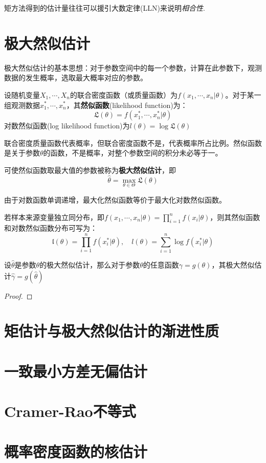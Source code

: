 \begin{remark}
    矩方法得到的估计量往往可以援引大数定律(LLN)来说明\emph{相合性}. 
\end{remark}

\section{极大然似估计}

极大然似估计的基本思想：对于参数空间中的每一个参数，计算在此参数下，观测数据的发生概率，选取最大概率对应的参数。

\begin{definition}[然似函数]
    设随机变量$X_1,\cdots ,X_n$的联合密度函数（或质量函数）为$f(x_1,\cdots ,x_n|\theta)$。对于某一组观测数据$x_1^* ,\cdots ,x_n^*$，其\textbf{然似函数}(likelihood function)为：
    \[ \mathfrak{L}(\theta) = f(x_1^* ,\cdots ,x_n^*|\theta) \]
    对数然似函数(log likelihood function)为$l(\theta)=\log\mathfrak{L}(\theta)$
\end{definition}
\begin{remark}
    联合密度质量函数代表概率，但联合密度函数不是，代表概率所占比例。然似函数是关于参数$\theta$的函数，不是概率，对整个参数空间的积分未必等于一。
\end{remark}

\begin{definition}[极大然似估计]
    可使然似函数取最大值的参数被称为\textbf{极大然似估计}，即
    \[ \hat{\theta}=\max_{\theta \in \Theta}\mathfrak{L}(\theta) \]
\end{definition}
\begin{remark}
    由于对数函数单调递增，最大化然似函数等价于最大化对数然似函数。
\end{remark}

若样本来源变量独立同分布，即$f(x_1,\cdots ,x_n|\theta)=\prod_{i=1}^nf(x_i|\theta)$，则其然似函数和对数然似函数分布可写为：
\[ \mathfrak{l}(\theta) = \prod_{i=1}^nf(x_i^*|\theta), \quad l(\theta) = \sum_{i=1}^n \log f(x_i^*|\theta) \]

\begin{proposition}[极大然似估计的不变性]
    设$\hat{\theta}$是参数$\theta$的极大然似估计，那么对于参数$\theta$的任意函数$\gamma = g(\theta)$，其极大然似估计$\hat{\gamma}=g(\hat{\theta})$
\end{proposition}
\begin{proof}
\end{proof}

\section{矩估计与极大然似估计的渐进性质}



\section{一致最小方差无偏估计}

\section{Cramer-Rao不等式}

\section{概率密度函数的核估计}
